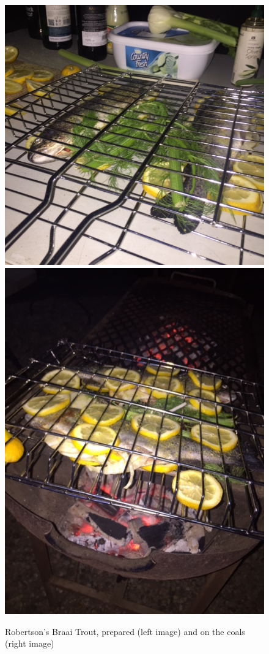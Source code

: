\begin{figure}[H]
\centering
  \includegraphics[scale=0.25]{recipes/braaiTroutPrepared.jpg} \hspace{1cm}  \includegraphics[scale=0.25]{recipes/braaiTroutCooking.jpg}
   \caption{Robertson's Braai Trout, prepared (left image) and on the coals (right image)}
  \label{fig:braaiTroutPrepared}
\end{figure}  


